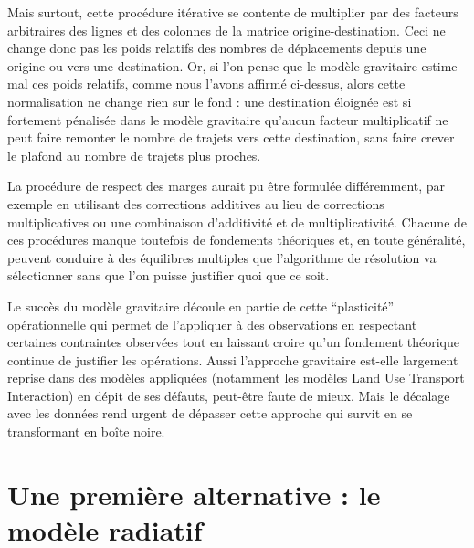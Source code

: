 \documentclass[
  10pt,
  a4paper,
  numbers=noendperiod,
  DIV=9]{scrreprt}
\begin{document}
Mais surtout, cette procédure itérative se contente de multiplier par
des facteurs arbitraires des lignes et des colonnes de la matrice
origine-destination. Ceci ne change donc pas les poids relatifs des
nombres de déplacements depuis une origine ou vers une destination. Or,
si l'on pense que le modèle gravitaire estime mal ces poids relatifs,
comme nous l'avons affirmé ci-dessus, alors cette normalisation ne
change rien sur le fond : une destination éloignée est si fortement
pénalisée dans le modèle gravitaire qu'aucun facteur multiplicatif ne
peut faire remonter le nombre de trajets vers cette destination, sans
faire crever le plafond au nombre de trajets plus proches.

La procédure de respect des marges aurait pu être formulée différemment,
par exemple en utilisant des corrections additives au lieu de
corrections multiplicatives ou une combinaison d'additivité et de
multiplicativité. Chacune de ces procédures manque toutefois de
fondements théoriques et, en toute généralité, peuvent conduire à des
équilibres multiples que l'algorithme de résolution va sélectionner sans
que l'on puisse justifier quoi que ce soit.

Le succès du modèle gravitaire découle en partie de cette ``plasticité''
opérationnelle qui permet de l'appliquer à des observations en
respectant certaines contraintes observées tout en laissant croire qu'un
fondement théorique continue de justifier les opérations. Aussi
l'approche gravitaire est-elle largement reprise dans des modèles
appliquées (notamment les modèles Land Use Transport Interaction) en
dépit de ses défauts, peut-être faute de mieux. Mais le décalage avec
les données rend urgent de dépasser cette approche qui survit en se
transformant en boîte noire.

\hypertarget{sec-rad}{%
\section{Une première alternative : le modèle radiatif}\label{sec-rad}}
\end{document}
